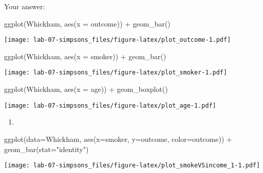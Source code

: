 \documentclass[
]{article}
\newenvironment{Shaded}{\begin{snugshade}}{\end{snugshade}}
\newcommand{\AttributeTok}[1]{\textcolor[rgb]{0.77,0.63,0.00}{#1}}
\newcommand{\FunctionTok}[1]{\textcolor[rgb]{0.00,0.00,0.00}{#1}}
\newcommand{\NormalTok}[1]{#1}
\newcommand{\SpecialCharTok}[1]{\textcolor[rgb]{0.00,0.00,0.00}{#1}}
\newcommand{\StringTok}[1]{\textcolor[rgb]{0.31,0.60,0.02}{#1}}
\providecommand{\tightlist}{%
  \setlength{\itemsep}{0pt}\setlength{\parskip}{0pt}}
\begin{document}
Your answer:

\begin{Shaded}
\begin{Highlighting}[]
\FunctionTok{ggplot}\NormalTok{(Whickham, }\FunctionTok{aes}\NormalTok{(}\AttributeTok{x =}\NormalTok{ outcome)) }\SpecialCharTok{+}
  \FunctionTok{geom\_bar}\NormalTok{()}
\end{Highlighting}
\end{Shaded}

\texttt{[image: lab-07-simpsons\_files/figure-latex/plot\_outcome-1.pdf]}

\begin{Shaded}
\begin{Highlighting}[]
\FunctionTok{ggplot}\NormalTok{(Whickham, }\FunctionTok{aes}\NormalTok{(}\AttributeTok{x =}\NormalTok{ smoker)) }\SpecialCharTok{+}
  \FunctionTok{geom\_bar}\NormalTok{()}
\end{Highlighting}
\end{Shaded}

\texttt{[image: lab-07-simpsons\_files/figure-latex/plot\_smoker-1.pdf]}

\begin{Shaded}
\begin{Highlighting}[]
\FunctionTok{ggplot}\NormalTok{(Whickham, }\FunctionTok{aes}\NormalTok{(}\AttributeTok{x =}\NormalTok{ age)) }\SpecialCharTok{+}
  \FunctionTok{geom\_boxplot}\NormalTok{()}
\end{Highlighting}
\end{Shaded}

\texttt{[image: lab-07-simpsons\_files/figure-latex/plot\_age-1.pdf]}

\begin{enumerate}
\def\labelenumi{\arabic{enumi}.}
\setcounter{enumi}{3}
\tightlist
\item
\end{enumerate}

\begin{Shaded}
\begin{Highlighting}[]
\FunctionTok{ggplot}\NormalTok{(}\AttributeTok{data=}\NormalTok{Whickham, }\FunctionTok{aes}\NormalTok{(}\AttributeTok{x=}\NormalTok{smoker, }\AttributeTok{y=}\NormalTok{outcome, }\AttributeTok{color=}\NormalTok{outcome)) }\SpecialCharTok{+} \FunctionTok{geom\_bar}\NormalTok{(}\AttributeTok{stat=}\StringTok{"identity"}\NormalTok{)}
\end{Highlighting}
\end{Shaded}

\texttt{[image: lab-07-simpsons\_files/figure-latex/plot\_smokeVSincome\_1-1.pdf]}
\end{document}
